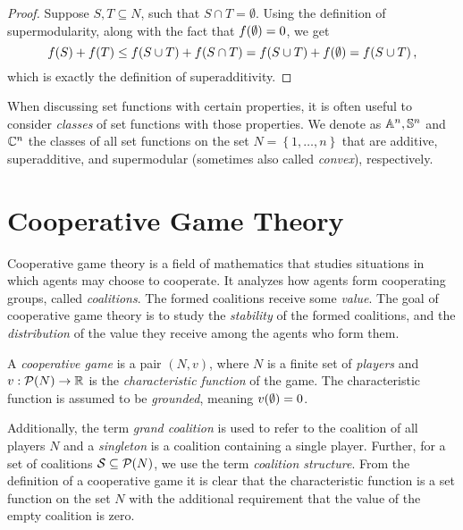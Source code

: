 \begin{proof}
	Suppose $ S,T \subseteq N $, such that $ S \cap T = \emptyset $.
	Using the definition of supermodularity, along with the fact that $ f\!\left(\emptyset\right) = 0 $, we get \[
		f\!\left(S\right) + f\!\left(T\right) \leq f\!\left(S \cup T\right) + f\!\left(S \cap T\right) = f\!\left(S \cup T\right) + f\!\left(\emptyset\right) = f\!\left(S \cup T\right),
	\]
	which is exactly the definition of superadditivity.
\end{proof}

When discussing set functions with certain properties, it is often useful to consider \emph{classes} of set functions with those properties.
We denote as $ \mathbb{A}^n, \mathbb{S}^n $ and $ \mathbb{C}^n $ the classes of all set functions on the set $ N = \left\{ 1, \ldots, n \right\} $ that are additive, superadditive, and supermodular (sometimes also called \emph{convex}), respectively.

\section{Cooperative Game Theory}

Cooperative game theory is a field of mathematics that studies situations in which agents may choose to cooperate.
It analyzes how agents form cooperating groups, called \emph{coalitions}.
The formed coalitions receive some \emph{value}.
The goal of cooperative game theory is to study the \emph{stability} of the formed coalitions, and the \emph{distribution} of the value they receive among the agents who form them.

\begin{defi}
	A \emph{cooperative game} is a pair $ \left( N,v \right) $, where $ N $ is a finite set of \emph{players} and $ v: \mathcal{P}\!\left(N\right) \to \mathbb{R} $ is the \emph{characteristic function} of the game.
	The characteristic function is assumed to be \emph{grounded}, meaning $ v\!\left(\emptyset\right) = 0 $.
\end{defi}

Additionally, the term \emph{grand coalition} is used to refer to the coalition of all players $ N $ and a \emph{singleton} is a coalition containing a single player.
Further, for a set of coalitions $ \mathcal{S} \subseteq \mathcal{P}\!\left(N\right) $, we use the term \emph{coalition structure}.
From the definition of a cooperative game it is clear that the characteristic function is a set function on the set $ N $ with the additional requirement that the value of the empty coalition is zero.

